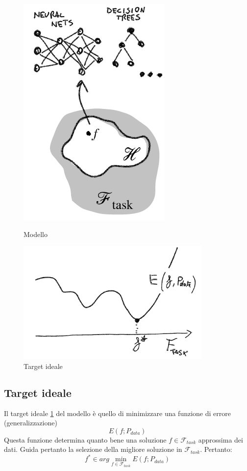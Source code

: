 \begin{figure}
	\centering
	\begin{minipage}{.5\textwidth}
		\centering
		\includegraphics[width=0.4\linewidth]{imgs/chapter2/img1}
		\caption{Modello}
		\label{fig:chapter02-01}
	\end{minipage}%
	\begin{minipage}{.5\textwidth}
		\centering
		\includegraphics[width=1\linewidth]{imgs/chapter2/img2}
		\caption{Target ideale}
		\label{fig:chapter02-02}
	\end{minipage}
\end{figure}

\subsection{Target ideale}
Il target ideale \ref{fig:chapter02-02} del modello \`e quello di minimizzare una funzione di errore (generalizzazione)
$$E(f;P_{data})$$
Questa funzione determina quanto bene una soluzione $f\in\mathcal{F}_{task}$ approssima dei dati.
Guida pertanto la selezione della migliore soluzione in $\mathcal{F}_{task}$.
Pertanto:
$$f^*\in arg\min\limits_{f\in\mathcal{F}_{task}}E(f;P_{data})$$

